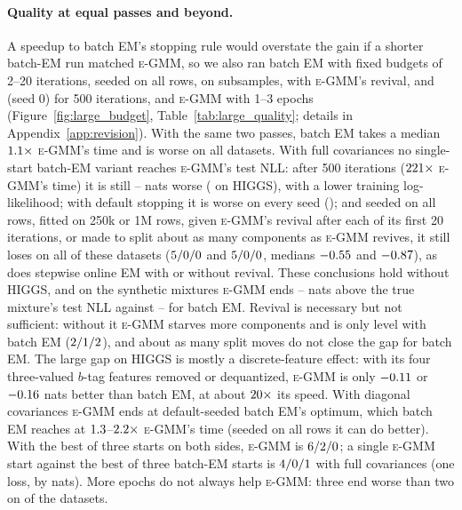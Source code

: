 \documentclass[10pt]{article} %
\newcommand{\egmm}{\textsc{e-GMM}}
\begin{document}
\paragraph{Quality at equal passes and beyond.} A speedup to batch EM's stopping rule would overstate the gain if a shorter batch-EM run matched \egmm{}, so we also ran batch EM with fixed budgets of 2--20 iterations, seeded on all rows, on subsamples, with \egmm{}'s revival, and (seed 0) for 500 iterations, and \egmm{} with 1--3 epochs (Figure~\ref{fig:large_budget}, Table~\ref{tab:large_quality}; details in Appendix~\ref{app:revision}). With the same two passes, batch EM takes a median $1.1\times$ \egmm{}'s time and is worse on all \rSnLg{} datasets. With full covariances no single-start batch-EM variant reaches \egmm{}'s test NLL: after 500 iterations ($221\times$ \egmm{}'s time) it is still \rSLongMinGap{}--\rSLongMaxGapNoHiggs{} nats worse (\rSLongMaxGap{} on HIGGS), with a lower training log-likelihood; with default stopping it is worse on every seed (\rSLgSeedWins); and seeded on all rows, fitted on 250k or 1M rows, given \egmm{}'s revival after each of its first 20 iterations, or made to split about as many components as \egmm{} revives, it still loses on all of these datasets ($5/0/0$ and $5/0/0$, medians $-0.55$ and $-0.87$), as does stepwise online EM with or without revival. These conclusions hold without HIGGS, and on the synthetic mixtures \egmm{} ends \rSOrcFullEMin--\rSOrcFullEMax{} nats above the true mixture's test NLL against \rSOrcFullBMin--\rSOrcFullBMax{} for batch EM. Revival is necessary but not sufficient: without it \egmm{} starves more components and is only level with batch EM ($2/1/2$), and about as many split moves do not close the gap for batch EM. The large gap on HIGGS is mostly a discrete-feature effect: with its four three-valued $b$-tag features removed or dequantized, \egmm{} is only $-0.11$ or $-0.16$ nats better than batch EM, at about $20\times$ its speed. With diagonal covariances \egmm{} ends at default-seeded batch EM's optimum, which batch EM reaches at $1.3$--$2.2\times$ \egmm{}'s time (seeded on all rows it can do better). With the best of three starts on both sides, \egmm{} is $6/2/0$; a single \egmm{} start against the best of three batch-EM starts is $4/0/1$ with full covariances (one loss, by \rSLgBestThreeFullWorst{} nats). More epochs do not always help \egmm{}: three end worse than two on \rSLgEthreeWorse{} of the \rSnLg{} datasets.
\end{document}
